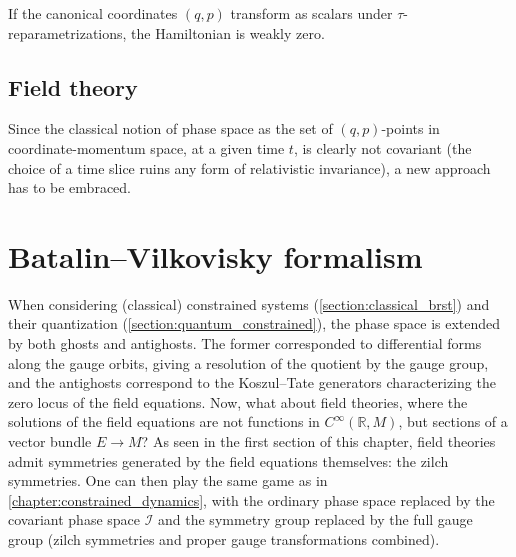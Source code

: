     \begin{property}
        If the canonical coordinates $(q,p)$ transform as scalars under $\tau$-reparametrizations, the Hamiltonian is weakly zero.
    \end{property}

\subsection{Field theory}

    Since the classical notion of phase space as the set of $(q,p)$-points in coordinate-momentum space, at a given time $t$, is clearly not covariant (the choice of a time slice ruins any form of relativistic invariance), a new approach has to be embraced.


\section{Batalin--Vilkovisky formalism}

    When considering (classical) constrained systems (\cref{section:classical_brst}) and their quantization (\cref{section:quantum_constrained}), the phase space is extended by both ghosts and antighosts. The former corresponded to differential forms along the gauge orbits, giving a resolution of the quotient by the gauge group, and the antighosts correspond to the Koszul--Tate generators characterizing the zero locus of the field equations. Now, what about field theories, where the solutions of the field equations are not functions in $C^\infty(\mathbb{R},M)$, but sections of a vector bundle $E\rightarrow M$? As seen in the first section of this chapter, field theories admit symmetries generated by the field equations themselves: the zilch symmetries. One can then play the same game as in \cref{chapter:constrained_dynamics}, with the ordinary phase space replaced by the covariant phase space $\mathcal{I}$ and the symmetry group replaced by the full gauge group (zilch symmetries and proper gauge transformations combined).

